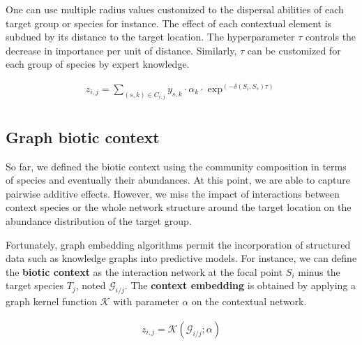 \documentclass[]{article}
\begin{document}
One can use multiple radius values customized to the dispersal abilities of each target group or species for instance. The effect of each contextual element is subdued by its distance to the target location. The hyperparameter $\tau$ controls the decrease in importance per unit of distance. Similarly, $\tau$ can be customized for each group of species by expert knowledge.  

\begin{equation*}
\begin{matrix}
z_{i,j} = \sum_{(s,k) \in C_{i,j}} y_{s,k} \cdot \alpha_{k} \cdot \exp^{(-\delta(S_i,S_s) \tau)} \\
\end{matrix}
\end{equation*}

\subsection{Graph biotic context}
So far, we defined the biotic context using the community composition in terms of species and eventually their abundances. At this point, we are able to capture pairwise additive effects. However, we miss the impact of interactions between context species or the whole network structure around the target location on the abundance distribution of the target group. 

Fortunately, graph embedding algorithms permit the incorporation of structured data such as knowledge graphs into predictive models. For instance, we can define the \textbf{biotic context} as the interaction network at the focal point $S_i$ minus the target species $T_j$, noted $\mathcal{G}_{i/j}$. The \textbf{context embedding} is obtained by applying a graph kernel function $\mathcal{K}$ with parameter $\alpha$ on the contextual network.

\begin{equation*}
\begin{matrix}
z_{i,j} = \mathcal{K}(\mathcal{G}_{i/j} ; \alpha) 
\end{matrix}
\end{equation*}
\end{document}
